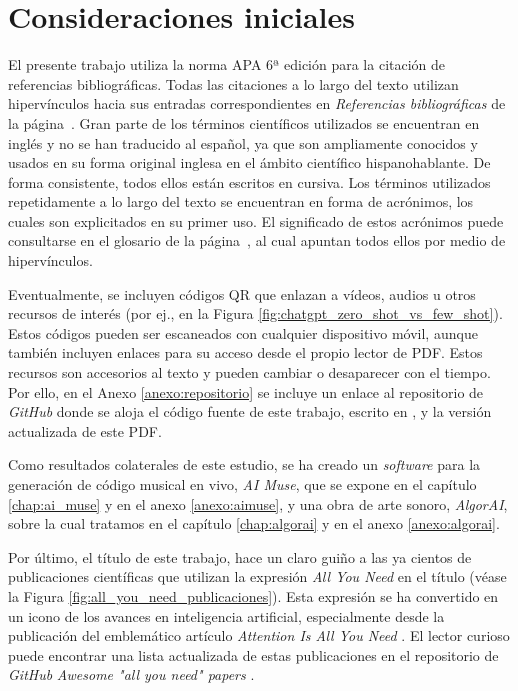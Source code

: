 \section{Consideraciones iniciales}

El presente trabajo utiliza la norma APA 6ª edición para la citación de referencias bibliográficas. Todas las citaciones a lo largo del texto utilizan hipervínculos hacia sus entradas correspondientes en \emph{Referencias bibliográficas} de la página~\pageref{chap:referencias}. Gran parte de los términos científicos utilizados se encuentran en inglés y no se han traducido al español, ya que son ampliamente conocidos y usados en su forma original inglesa en el ámbito científico hispanohablante. De forma consistente, todos ellos están escritos en cursiva. Los términos utilizados repetidamente a lo largo del texto se encuentran en forma de acrónimos, los cuales son explicitados en su primer uso. El significado de estos acrónimos puede consultarse en el glosario de la página~\pageref{chap:glosario}, al cual apuntan todos ellos por medio de hipervínculos.

Eventualmente, se incluyen códigos QR que enlazan a vídeos, audios u otros recursos de interés (por ej., en la Figura \ref{fig:chatgpt_zero_shot_vs_few_shot}). Estos códigos pueden ser escaneados con cualquier dispositivo móvil, aunque también incluyen enlaces para su acceso desde el propio lector de PDF. Estos recursos son accesorios al texto y pueden cambiar o desaparecer con el tiempo. Por ello, en el Anexo \ref{anexo:repositorio} se incluye un enlace al repositorio de \emph{GitHub} donde se aloja el código fuente de este trabajo, escrito en , y la versión actualizada de este PDF.

Como resultados colaterales de este estudio, se ha creado un \emph{software} para la generación de código musical en vivo, \emph{AI Muse}, que se expone en el capítulo \ref{chap:ai_muse} y en el anexo \ref{anexo:aimuse}, y una obra de arte sonoro, \emph{AlgorAI}, sobre la cual tratamos en el capítulo \ref{chap:algorai} y en el anexo \ref{anexo:algorai}.

Por último, el título de este trabajo, hace un claro guiño a las ya cientos de publicaciones científicas que utilizan la expresión \emph{All You Need} en el título (véase la Figura \ref{fig:all_you_need_publicaciones}). Esta expresión se ha convertido en un icono de los avances en inteligencia artificial, especialmente desde la publicación del emblemático artículo \emph{Attention Is All You Need} \citep{vaswaniAttentionAllYou2017}. El lector curioso puede encontrar una lista actualizada de estas publicaciones en el repositorio de \emph{GitHub} \emph{Awesome "all you need" papers} \citep{nishiKentoNishiAwesomeallyouneedpapers2024}.


